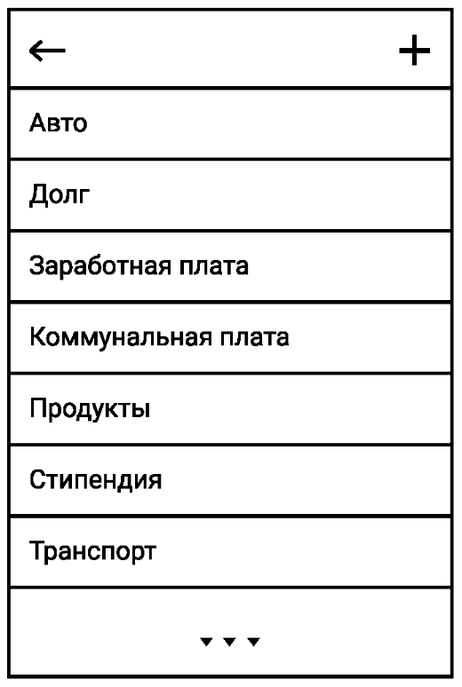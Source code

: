 \documentclass[russian,utf8,a1paper,nostitching,simple]{eskdgraph}
\begin{document}
\begin{ESKDdrawing}
\begin{minipage}{28cm}
\begin{minipage}{7.5cm}
      \vspace{2cm}
      \centering
      \includegraphics[width=\linewidth]{fig/ui_activities_categories_view.eps}
    \end{minipage}
    \hfill
    \begin{minipage}{7.5cm}
      \centering
      \vspace{1cm}


\end{minipage}
\end{minipage}
\end{ESKDdrawing}
\end{document}
